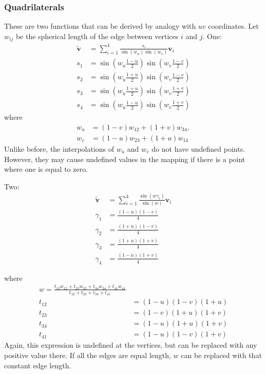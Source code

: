 \documentclass{amsart}[12pt]
\begin{document}
\subsubsection{Quadrilaterals}
These are two functions that can be derived by analogy with $uv$ coordinates.
Let $w_{ij}$ be the spherical length of the edge between vertices $i$ and $j$.
One:
\begin{equation}\begin{split}\label{eq:nsq1}
   \widetilde{\mathbf v} & = \sum_{i=1}^4\frac{s_i}{\sin(w_u)\sin(w_v)}  \mathbf v_i \\
s_1 & = \sin \left(w_u\frac{1-u}{2}\right)\sin \left(w_v\frac{1-v}{2}\right) \\
s_2 & = \sin \left(w_u\frac{1+u}{2}\right)\sin \left(w_v\frac{1-v}{2}\right) \\
s_3 & = \sin \left(w_u\frac{1+u}{2}\right)\sin \left(w_v\frac{1+v}{2}\right) \\
s_4 & = \sin \left(w_u\frac{1-u}{2}\right)\sin \left(w_v\frac{1+v}{2}\right)
\end{split}\end{equation}
where
\begin{equation}\begin{split}
  w_u &= (1-v) w_{12} + (1+v) w_{34},\\
  w_v &= (1-u) w_{23} + (1+u) w_{14}
\end{split}\end{equation}
Unlike before, the interpolations of $w_u$ and $w_v$ do not have undefined
points. However, they may cause undefined values in the mapping if there is a
point where one is equal to zero.

Two:
\begin{equation}\begin{split}\label{eq:nsq2}
     \widetilde{\mathbf v} & = \sum_{i=1}^4\frac{\sin(w\gamma_i)}{\sin(w)} \mathbf v_i \\
\gamma_1 & = \frac{(1-u)(1-v)}{4} \\
\gamma_2 & = \frac{(1+u)(1-v)}{4} \\
\gamma_3 & = \frac{(1+u)(1+v)}{4} \\
\gamma_4 & = \frac{(1-u)(1+v)}{4}
\end{split}\end{equation}

where
\begin{equation}\begin{split}
  w = \frac{t_{12} w_{12} + t_{23} w_{23} + t_{34} w_{34} + t_{41} w_{41}}
              {t_{12} + t_{23} + t_{34} + t_{41}}\\
  t_{12} &= (1-u)(1-v)(1+u) \\
  t_{23} &= (1-v)(1+u)(1+v) \\
  t_{34} &= (1-u)(1+u)(1+v) \\
  t_{41} &= (1-u)(1-v)(1+v)
\end{split}\end{equation}
Again, this expression is undefined at the vertices, but can be replaced with
any positive value there. If all the edges are equal length, $w$ can be
replaced with that constant edge length.
\end{document}
